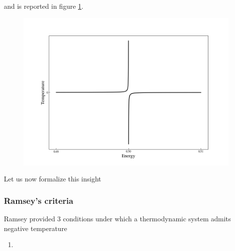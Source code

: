and is reported in figure \ref{fig:TLS_entropy_E}. \\
\begin{figure}
    \centering 
    \includegraphics[scale=0.5]{images/temperature_TLS.png}
    \caption{}
    \label{fig:TLS_entropy_E}
\end{figure}
Let us now formalize this insight 
\subsubsection*{Ramsey's criteria}
Ramsey %
provided 3 conditions under which a thermodynamic system admits negative temperature
\begin{enumerate}
    \item 
\end{enumerate}